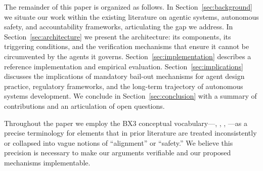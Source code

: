 The remainder of this paper is organized as follows. In Section~\ref{sec:background} we situate our work within the existing literature on agentic systems, autonomous safety, and accountability frameworks, articulating the gap we address. In Section~\ref{sec:architecture} we present the \bxthree architecture: its components, its triggering conditions, and the verification mechanisms that ensure it cannot be circumvented by the agents it governs. Section~\ref{sec:implementation} describes a reference implementation and empirical evaluation. Section~\ref{sec:implications} discusses the implications of mandatory bail-out mechanisms for agent design practice, regulatory frameworks, and the long-term trajectory of autonomous systems development. We conclude in Section~\ref{sec:conclusion} with a summary of contributions and an articulation of open questions.

Throughout the paper we employ the BX3 conceptual vocabulary—\bxthree, \purpose, \bounds, \fact—as a precise terminology for elements that in prior literature are treated inconsistently or collapsed into vague notions of ``alignment'' or ``safety.'' We believe this precision is necessary to make our arguments verifiable and our proposed mechanisms implementable.